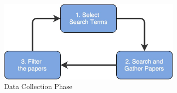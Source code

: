 \begin{figure}[H]
\begin{center}
\includegraphics[width=0.8\textwidth]{figures/introduction_data_collection_phase}
\caption{Data Collection Phase}
\label{fig:context/data_collection_phase}
\end{center}
\end{figure}

